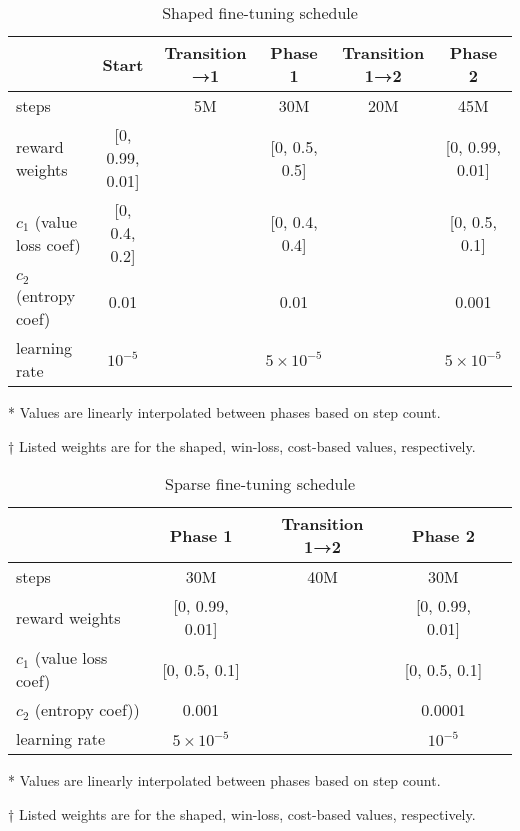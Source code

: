 \documentclass{article}
\begin{document}
\begin{table}[H]
    \centering
    \begin{threeparttable}
    \caption{Shaped fine-tuning schedule}
    \label{tab:shaped-finetuning-schedule}
    \begin{tabular}{lccccc}
    \toprule
     & Start & Transition →1\tnote{*} & Phase 1 & Transition 1→2\tnote{*} & Phase 2 \\
     \midrule
    steps & & 5M & 30M & 20M & 45M \\
    reward weights\tnote{†} & [0, 0.99, 0.01] & & [0, 0.5, 0.5] & & [0, 0.99, 0.01] \\
    $c_1$ (value loss coef)\tnote{†} & [0, 0.4, 0.2] & & [0, 0.4, 0.4] & & [0, 0.5, 0.1]\\
    $c_2$ (entropy coef) & 0.01 & & 0.01 & & 0.001 \\
    learning rate & $10^{-5}$ & & $5 \times 10^{-5}$ & & $5 \times 10^{-5}$\\
    \bottomrule
    \end{tabular}
    \begin{tablenotes}
       \item[*] Values are linearly interpolated between phases based on step count.
       \item[†] Listed weights are for the shaped, win-loss, cost-based values, respectively.
    \end{tablenotes}
    \end{threeparttable}
\end{table}

\begin{table}[H]
    \centering
    \begin{threeparttable}
    \caption{Sparse fine-tuning schedule}
    \label{tab:sparse-finetuning-schedule}
    \begin{tabular}{lcccc}
    \toprule
     & Phase 1 & Transition 1→2\tnote{*} & Phase 2 \\
     \midrule
    steps & 30M & 40M & 30M \\
    reward weights\tnote{†} & [0, 0.99, 0.01] &  & [0, 0.99, 0.01] \\
    $c_1$ (value loss coef)\tnote{†} & [0, 0.5, 0.1] &  & [0, 0.5, 0.1]\\
    $c_2$ (entropy coef)) & 0.001 & & 0.0001 \\
    learning rate & $5 \times 10^{-5}$ & & $10^{-5}$ \\
    \bottomrule
    \end{tabular}
    \begin{tablenotes}
       \item[*] Values are linearly interpolated between phases based on step count.
       \item[†] Listed weights are for the shaped, win-loss, cost-based values, respectively.
    \end{tablenotes}
    \end{threeparttable}
\end{table}
\end{document}
